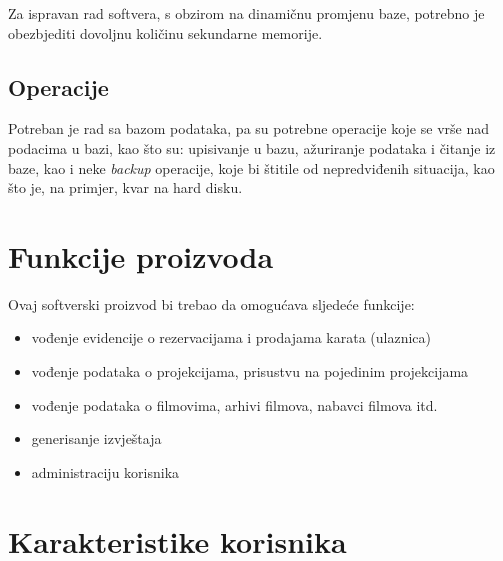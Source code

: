 Za ispravan rad softvera, s obzirom na dinamičnu promjenu baze, potrebno je obezbjediti dovoljnu količinu sekundarne memorije. 

\subsection{Operacije}

Potreban je rad sa bazom podataka, pa su potrebne operacije
koje se vrše nad podacima u bazi, kao što su: upisivanje u bazu,
ažuriranje podataka i čitanje iz baze, kao i neke \textit{backup} operacije, koje bi
štitile od nepredviđenih situacija, kao što je, na primjer, kvar na hard disku.


\section{Funkcije proizvoda}

Ovaj softverski proizvod bi trebao da omogućava sljedeće funkcije:
\begin{itemize}
  \item vođenje evidencije o rezervacijama i prodajama karata (ulaznica)
  \item vođenje podataka o projekcijama, prisustvu na pojedinim projekcijama
  \item vođenje podataka o filmovima, arhivi filmova, nabavci filmova itd.
  \item generisanje  izvještaja
  \item administraciju korisnika  
\end{itemize}

\section{Karakteristike korisnika}

